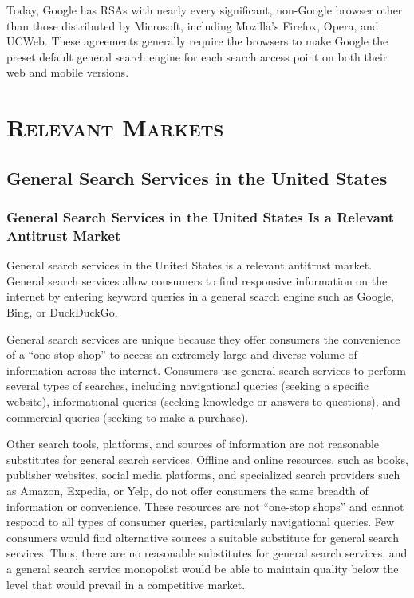 \documentclass[11pt,b5paper,headings=small]{scrartcl}
\begin{document}

Today, Google has RSAs with nearly every significant, non-Google browser other
than those distributed by Microsoft, including Mozilla’s Firefox, Opera, and UCWeb. These
agreements generally require the browsers to make Google the preset default general search
engine for each search access point on both their web and mobile versions.


\section{\rmfamily\textsc{Relevant Markets}}

\subsection{General Search Services in the United States}





\subsubsection{General Search Services in the United States Is a Relevant Antitrust
Market}
General search services in the United States is a relevant antitrust market. General
search services allow consumers to find responsive information on the internet by entering
keyword queries in a general search engine such as Google, Bing, or DuckDuckGo.


General search services are unique because they offer consumers the convenience
of a “one-stop shop” to access an extremely large and diverse volume of information across the
internet. Consumers use general search services to perform several types of searches, including
navigational queries (seeking a specific website), informational queries (seeking knowledge or
answers to questions), and commercial queries (seeking to make a purchase).


Other search tools, platforms, and sources of information are not reasonable
substitutes for general search services. Offline and online resources, such as books, publisher
websites, social media platforms, and specialized search providers such as Amazon, Expedia, or
Yelp, do not offer consumers the same breadth of information or convenience. These resources
are not “one-stop shops” and cannot respond to all types of consumer queries, particularly
navigational queries. Few consumers would find alternative sources a suitable substitute for
general search services. Thus, there are no reasonable substitutes for general search services, and
a general search service monopolist would be able to maintain quality below the level that would
prevail in a competitive market.
\end{document}
